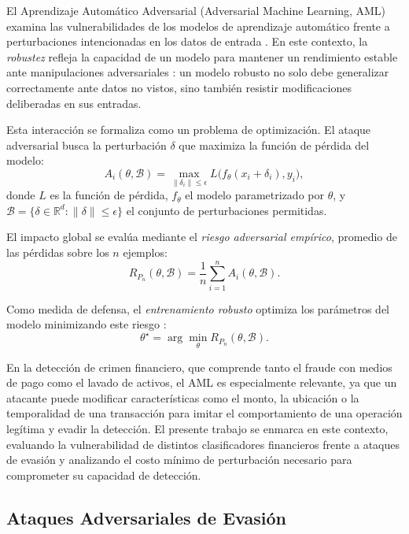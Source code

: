 El Aprendizaje Automático Adversarial (Adversarial Machine Learning, AML) examina las vulnerabilidades de los modelos de aprendizaje automático frente a perturbaciones intencionadas en los datos de entrada \cite{biggio2018wild}. En este contexto, la \textit{robustez} refleja la capacidad de un modelo para mantener un rendimiento estable ante manipulaciones adversariales \cite{fawzi_robustness_2016}: un modelo robusto no solo debe generalizar correctamente ante datos no vistos, sino también resistir modificaciones deliberadas en sus entradas.

Esta interacción se formaliza como un problema de optimización. El ataque adversarial busca la perturbación $\delta$ que maximiza la función de pérdida del modelo:
\[
A_i(\theta, \mathcal{B}) = \max_{\|\delta_i\| \leq \epsilon} L\big(f_\theta(x_i + \delta_i), y_i\big),
\]
donde $L$ es la función de pérdida, $f_\theta$ el modelo parametrizado por $\theta$, y $\mathcal{B} = \{\delta \in \mathbb{R}^d : \|\delta\| \leq \epsilon\}$ el conjunto de perturbaciones permitidas.

El impacto global se evalúa mediante el \textit{riesgo adversarial empírico}, promedio de las pérdidas sobre los $n$ ejemplos:
\[
R_{P_n}(\theta, \mathcal{B}) = \frac{1}{n} \sum_{i=1}^{n} A_i(\theta, \mathcal{B}).
\]

Como medida de defensa, el \textit{entrenamiento robusto} optimiza los parámetros del modelo minimizando este riesgo \cite{goodfellow2015explaining}:
\[
\theta^{\star} = \arg\min_{\theta} R_{P_n}(\theta, \mathcal{B}).
\]

En la detección de crimen financiero, que comprende tanto el fraude con medios de pago como el lavado de activos, el AML es especialmente relevante, ya que un atacante puede modificar características como el monto, la ubicación o la temporalidad de una transacción para imitar el comportamiento de una operación legítima y evadir la detección. El presente trabajo se enmarca en este contexto, evaluando la vulnerabilidad de distintos clasificadores financieros frente a ataques de evasión y analizando el costo mínimo de perturbación necesario para comprometer su capacidad de detección.


\subsection{Ataques Adversariales de Evasión}

